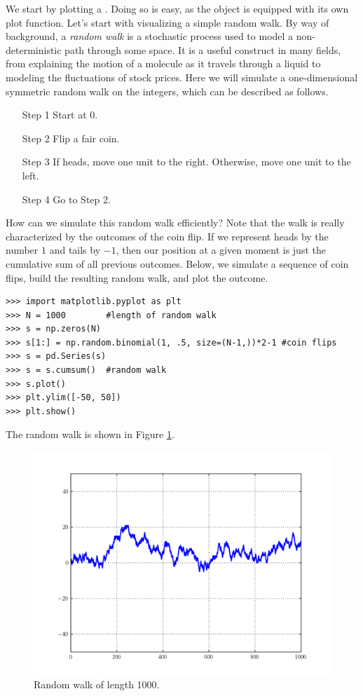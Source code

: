 We start by plotting a . Doing so is easy, as the  object is equipped with its own plot
function.
Let's start with visualizing a simple random walk. By way of background, a \emph{random walk} is a
stochastic process used to model a non-deterministic path through some space. It is a useful construct in
many fields, from explaining the motion of a molecule as it travels through a liquid to modeling the fluctuations
of stock prices. Here we will simulate a one-dimensional symmetric random walk on the integers, which can be
described as follows.
\begin{itemize}
  \item[Step 1] Start at 0.
  \item[Step 2] Flip a fair coin.
  \item[Step 3] If heads, move one unit to the right. Otherwise, move one unit to the left.
  \item[Step 4] Go to Step 2.
\end{itemize}
How can we simulate this random walk efficiently? Note that the walk is really characterized by the outcomes
of the coin flip. If we represent heads by the number $1$ and tails by $-1$, then our position at a given moment
is just the cumulative sum of all previous outcomes. Below, we simulate a sequence of coin flips, build the
resulting random walk, and plot the outcome.
\begin{lstlisting}
>>> import matplotlib.pyplot as plt
>>> N = 1000        #length of random walk
>>> s = np.zeros(N)
>>> s[1:] = np.random.binomial(1, .5, size=(N-1,))*2-1 #coin flips
>>> s = pd.Series(s)
>>> s = s.cumsum()  #random walk
>>> s.plot()
>>> plt.ylim([-50, 50])
>>> plt.show()
\end{lstlisting}

The random walk is shown in Figure \ref{fig:PandasRandomWalk}.

\begin{figure}
\centering
\includegraphics[width=.7 \textwidth]{randomWalk.pdf}
\caption{Random walk of length 1000.}
\label{fig:PandasRandomWalk}
\end{figure}


